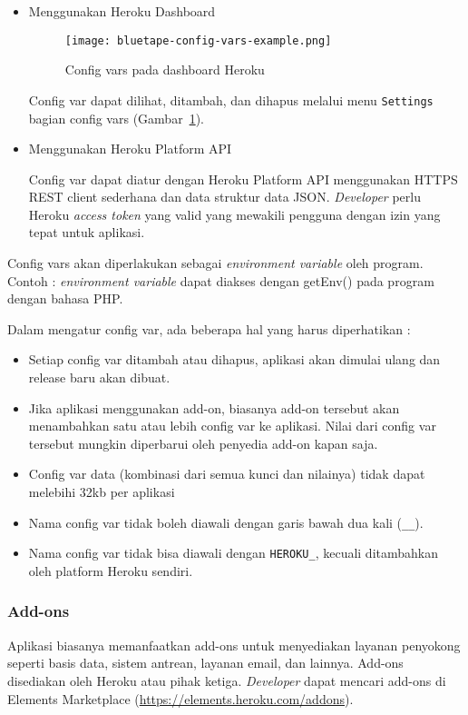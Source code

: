 \begin{itemize}
\begin{itemize}
\end{itemize}

\item Menggunakan Heroku Dashboard

\begin{figure}[H]
	\centering  
	\texttt{[image: bluetape-config-vars-example.png]}  
	\caption[Config vars pada dashboard Heroku]{Config vars pada dashboard Heroku} 
	\label{fig:bluetape-config-vars-example} 
\end{figure}

Config var dapat dilihat, ditambah, dan dihapus melalui menu \texttt{Settings} bagian config vars (Gambar~\ref{fig:bluetape-config-vars-example}).

\item Menggunakan Heroku Platform API

Config var dapat diatur dengan Heroku Platform API menggunakan HTTPS REST client sederhana dan data struktur data JSON. \textit{Developer} perlu Heroku \textit{access token} yang valid yang mewakili pengguna dengan izin yang tepat untuk aplikasi.

\end{itemize}

Config vars akan diperlakukan sebagai \textit{environment variable} oleh program. Contoh : \textit{environment variable} dapat diakses dengan getEnv() pada program dengan bahasa PHP.
 
Dalam mengatur config var, ada beberapa hal yang harus diperhatikan :
\begin{itemize}
\item Setiap config var ditambah atau dihapus, aplikasi akan dimulai ulang dan release baru akan dibuat.
\item Jika aplikasi menggunakan add-on, biasanya add-on tersebut akan menambahkan satu atau lebih config var ke aplikasi. Nilai dari config var tersebut mungkin diperbarui oleh penyedia add-on kapan saja.
\item Config var data (kombinasi dari semua kunci dan nilainya) tidak dapat melebihi 32kb per aplikasi
\item Nama config var tidak boleh diawali dengan garis bawah dua kali (\texttt{\_\_}).
\item Nama config var tidak bisa diawali dengan \texttt{HEROKU\_}, kecuali ditambahkan oleh platform Heroku sendiri.
\end{itemize}

\subsubsection{Add-ons}
Aplikasi biasanya memanfaatkan add-ons untuk menyediakan layanan penyokong seperti basis data, sistem antrean, layanan email, dan lainnya. Add-ons disediakan oleh Heroku atau pihak ketiga. \textit{Developer} dapat mencari add-ons di Elements Marketplace (\url{https://elements.heroku.com/addons}). 

